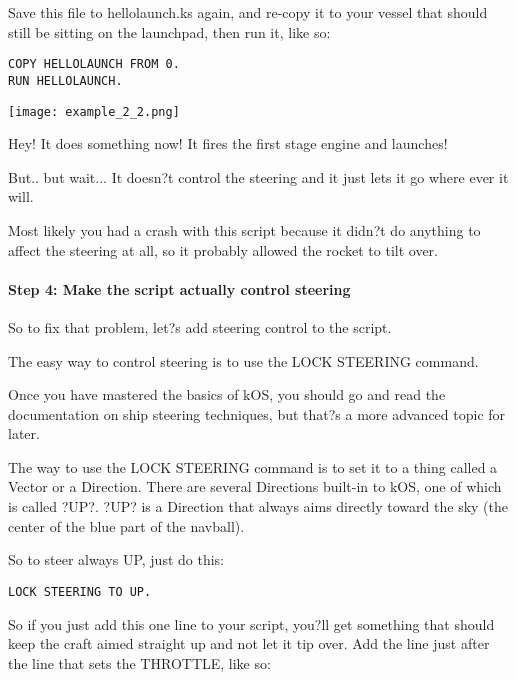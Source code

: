 Save this file to hellolaunch.ks again, and re-copy it to your vessel that should still be sitting on the launchpad, then run it, like so:

\begin{Verbatim}[frame=single]
COPY HELLOLAUNCH FROM 0.
RUN HELLOLAUNCH.
\end{Verbatim} 

\begin{center}
\texttt{[image: example\_2\_2.png]}
\end{center}

Hey! It does something now! It fires the first stage engine and launches!

But.. but wait... It doesn?t control the steering and it just lets it go where ever it will.

Most likely you had a crash with this script because it didn?t do anything to affect the steering at all, so it probably allowed the rocket to tilt over.

\paragraph{Step 4: Make the script actually control steering}
So to fix that problem, let?s add steering control to the script.

The easy way to control steering is to use the LOCK STEERING command.

Once you have mastered the basics of kOS, you should go and read the documentation on ship steering techniques, but that?s a more advanced topic for later.

The way to use the LOCK STEERING command is to set it to a thing called a Vector or a Direction. There are several Directions built-in to kOS, one of which is called ?UP?. ?UP? is a Direction that always aims directly toward the sky (the center of the blue part of the navball).

So to steer always UP, just do this:

\begin{Verbatim}[frame=single]
LOCK STEERING TO UP.
\end{Verbatim} 

So if you just add this one line to your script, you?ll get something that should keep the craft aimed straight up and not let it tip over. Add the line just after the line that sets the THROTTLE, like so:

